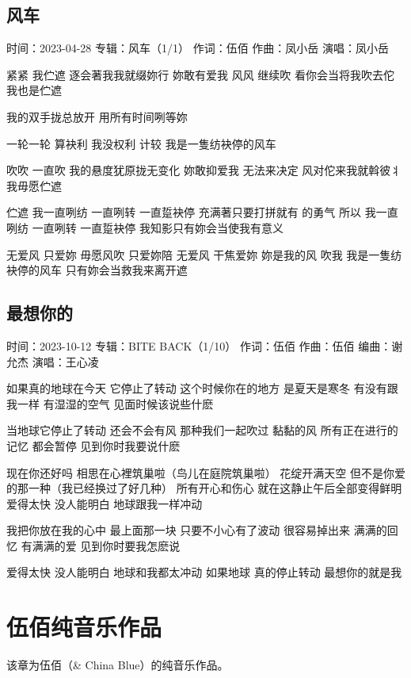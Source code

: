 \documentclass[UTF8,a4paper,oneside,twocolumn,12pt]{ctexbook}
\newcommand{\infopair}[2]{\textbullet #1：#2}
\newcommand{\zc}[1][伍佰]{\infopair{作词}{#1}}
\newcommand{\zq}[1][伍佰]{\infopair{作曲}{#1}}
\newcommand{\bq}[1][伍佰]{\infopair{编曲}{#1}}
\newcommand{\zj}[1]{\infopair{专辑}{#1}}
\newcommand{\sj}[1]{\infopair{时间}{#1}}
\newenvironment{info}{\begin{flushleft}\kaishu
	}
	{\end{flushleft}\normalsize\yahei\par}
\newenvironment{lyric}{
	}
{}
\begin{document}
\section{风车}
\begin{info}
	\sj{2023-04-28}
	\zj{风车（1/1）}
	\zc
	\zq[凤小岳]
	\infopair{演唱}{凤小岳}
\end{info}
\begin{lyric}
	紧紧 我伫遮
	逐会著我我就缀妳行
	妳敢有爱我
	风风 继续吹
	看你会当将我吹去佗
	我也是伫遮

	我的双手拢总放开
	用所有时间咧等妳

	一轮一轮 算袂利
	我没权利 计较
	我是一隻纺袂停的风车

	吹吹 一直吹
	我的悬度犹原拢无变化
	妳敢抑爱我
	无法来决定
	风对佗来我就斡彼丬
	我毋愿伫遮

	伫遮 我一直咧纺 一直咧转 一直踅袂停
	充满著只要打拼就有 的勇气
	所以 我一直咧纺 一直咧转 一直踅袂停
	我知影只有妳会当使我有意义

	无爱风 只爱妳 毋愿风吹 只爱妳陪 无爱风 干焦爱妳 妳是我的风 吹我
	我是一隻纺袂停的风车 只有妳会当救我来离开遮
\end{lyric}

\section{最想你的}
\begin{info}
	\sj{2023-10-12}
	\zj{BITE BACK（1/10）}
	\zc
	\zq
	\bq[谢允杰]
	\infopair{演唱}{王心凌}
\end{info}
\begin{lyric}%
	如果真的地球在今天 它停止了转动
	这个时候你在的地方 是夏天是寒冬
	有没有跟我一样 有湿湿的空气
	见面时候该说些什麽

	当地球它停止了转动 还会不会有风
	那种我们一起吹过 黏黏的风
	所有正在进行的记忆 都会暂停
	见到你时我要说什麽

	现在你还好吗 相思在心裡筑巢啦（鸟儿在庭院筑巢啦）
	花绽开满天空 但不是你爱的那一种（我已经换过了好几种）
	所有开心和伤心
	就在这静止午后全部变得鲜明
	爱得太快 没人能明白
	地球跟我一样冲动

	我把你放在我的心中 最上面那一块
	只要不小心有了波动 很容易掉出来
	满满的回忆 有满满的爱
	见到你时要我怎麽说

	爱得太快 没人能明白
	地球和我都太冲动
	如果地球 真的停止转动
	最想你的就是我
\end{lyric}

\chapter{伍佰纯音乐作品}
该章为伍佰（\& China Blue）的纯音乐作品。
\end{document}
